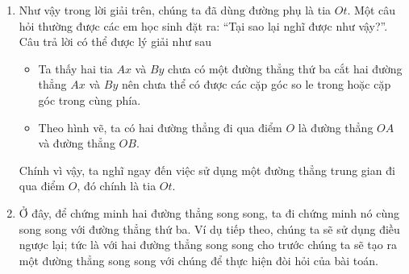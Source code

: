 \begin{nx}
	\begin{enumerate}[1.]
		\item Như vậy trong lời giải trên, chúng ta đã dùng đường phụ là tia $Ot$. Một câu hỏi thường được các em học sinh đặt ra: ``Tại sao lại nghĩ được như vậy?''. Câu trả lời có thể được lý giải như sau
		\begin{itemize}
			\item Ta thấy hai tia $Ax$ và $By$ chưa có một đường thẳng thứ ba cắt hai đường thẳng $Ax$ và $By$ nên chưa thể có được các cặp góc so le trong hoặc cặp góc trong cùng phía.
			\item Theo hình vẽ, ta có hai đường thẳng đi qua điểm $O$ là đường thẳng $OA$ và đường thẳng $OB$.
		\end{itemize}
		
		Chính vì vậy, ta nghĩ ngay đến việc sử dụng một đường thẳng trung gian đi qua điểm $O$, đó chính là tia $Ot$.
		\item Ở đây, để chứng minh hai đường thẳng song song, ta đi chứng minh nó cùng song song với đường thẳng thứ ba. Ví dụ tiếp theo, chúng ta sẽ sử dụng điều ngược lại; tức là với hai đường thẳng song song cho trước chúng ta sẽ tạo ra một đường thẳng song song với chúng để thực hiện đòi hỏi của bài toán.
	\end{enumerate}
\end{nx}
	

